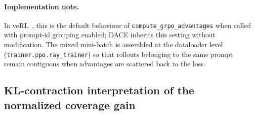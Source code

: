 \documentclass{article}
\newcommand{\method}{\textsc{DACE}\xspace}
\begin{document}
\paragraph{Implementation note.} In veRL~\citep{sheng2025verl}, this is the default behaviour of \texttt{compute\_grpo\_advantages} when called with prompt-id grouping enabled; \method inherits this setting without modification. The mixed mini-batch is assembled at the dataloader level (\texttt{trainer.ppo.ray\_trainer}) so that rollouts belonging to the same prompt remain contiguous when advantages are scattered back to the loss.


\subsection{KL-contraction interpretation of the normalized coverage gain}
\label{apdx:kl-contraction}
\end{document}

